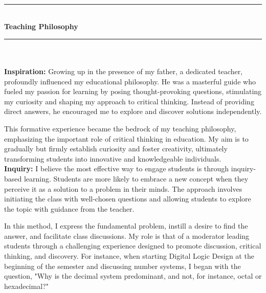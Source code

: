   
 
 \phantom \quad \\
  \newpage
   \thispagestyle{empty}
\hrule \phantom \quad  \vspace*{1\baselineskip}  \\
{\bf Teaching Philosophy}
 \vspace*{1\baselineskip}  \hrule \phantom \quad \\
\vspace*{3\baselineskip} \phantom \quad \\
{\bf Inspiration:}
Growing up in the presence of my father, a dedicated teacher, profoundly influenced my educational philosophy. He was a masterful guide who fueled my passion for learning by posing thought-provoking questions, stimulating my curiosity and shaping my approach to critical thinking. Instead of providing direct answers, he encouraged me to explore and discover solutions independently. 

This formative experience became the bedrock of my teaching philosophy, emphasizing the important role of critical thinking in education. My aim is to gradually but firmly establish curiosity and foster creativity, ultimately transforming students into innovative and knowledgeable individuals.
 \\ [0.2cm]
{\bf Inquiry: }
I believe the most effective way to engage students is through inquiry-based learning. Students are more likely to embrace a new concept when they perceive it as a solution to a problem in their minds. The approach involves initiating the class with well-chosen questions and allowing students to explore the topic with guidance from the teacher. 

In this method, I express the fundamental problem, instill a desire to find the answer, and facilitate class discussions. My role is that of a moderator leading students through a challenging experience designed to promote discussion, critical thinking, and discovery. For instance, when starting Digital Logic Design at the beginning of the semester and discussing number systems, I began with the question, "Why is the decimal system predominant, and not, for instance, octal or hexadecimal?" 

